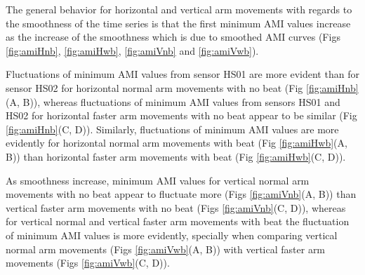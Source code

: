 The general behavior for horizontal and vertical arm movements with regards
to the smoothness of the time series is that the first minimum AMI values 
increase as the increase of the smoothness which is due to smoothed AMI 
curves 
(Figs \ref{fig:amiHnb}, \ref{fig:amiHwb}, \ref{fig:amiVnb} and 
\ref{fig:amiVwb}).

Fluctuations of minimum AMI values from sensor HS01 are more evident than 
for sensor HS02 for horizontal normal arm movements with no beat 
(Fig \ref{fig:amiHnb}(A, B)),
whereas fluctuations of minimum AMI values from sensors HS01 and HS02 
for horizontal faster arm movements with no beat appear to be similar 
(Fig \ref{fig:amiHnb}(C, D)).
Similarly, fluctuations of minimum AMI values are more evidently for 
horizontal normal arm movements with beat (Fig \ref{fig:amiHwb}(A, B)) than 
horizontal faster arm movements with beat (Fig \ref{fig:amiHwb}(C, D)).

As smoothness increase, minimum AMI values for vertical normal arm movements 
with no beat appear to fluctuate more (Figs \ref{fig:amiVnb}(A, B))
than vertical faster arm movements with no beat (Figs \ref{fig:amiVnb}(C, D)),
whereas for vertical normal and vertical faster arm movements with beat 
the fluctuation of minimum AMI values is more evidently,
specially when comparing vertical normal arm movements 
(Figs \ref{fig:amiVwb}(A, B)) with vertical faster arm movements 
(Figs \ref{fig:amiVwb}(C, D)).





